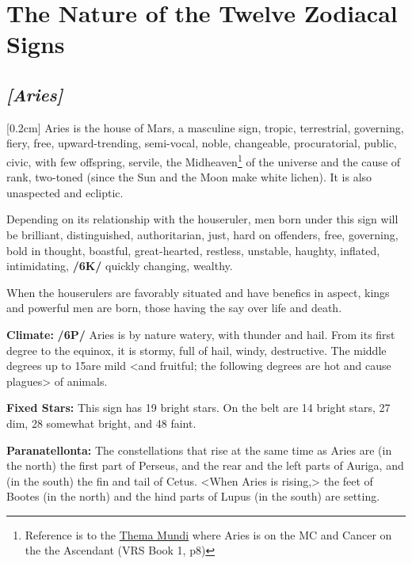 
\section{The Nature of the Twelve Zodiacal Signs}
\subsection{\textit{[Aries]}}
[0.2cm]
 Aries is the house of Mars, a  masculine sign,  tropic,  terrestrial, governing,  fiery, free, upward-trending,  semi-vocal, noble, changeable, procuratorial, public, civic, with few offspring,  servile, the Midheaven\footnote{Reference is to the \href{http://planetwavesweekly.com/dadatemp/1832374392.html}{Thema Mundi} where Aries is on the MC and Cancer on the the Ascendant (VRS Book 1, p8)} of the universe and the cause of rank, two-toned (since the Sun and the Moon make white lichen). It is also unaspected and ecliptic. 

\mndl[0.2cm]
Depending on its relationship with the houseruler, men born under this sign will be brilliant, distinguished, authoritarian, just, hard on offenders, free, governing, bold in thought, boastful, great-hearted, restless, unstable, haughty, inflated, intimidating, \textbf{/6K/} quickly changing, wealthy. 

\mndl[0.2cm]
When the houserulers are favorably situated and have benefics in aspect, kings and powerful men are born, those
having the say over life and death.

\textbf{Climate:} \textbf{/6P/} Aries is by nature watery, with thunder and hail. From its first degree to the equinox, it is stormy, full of hail, windy, destructive. The middle degrees up to 15\deg are mild <and fruitful; the following degrees are hot and cause plagues> of animals. 

\textbf{Fixed Stars:} This sign has 19 bright stars. On the belt are 14 bright stars, 27 dim, 28 somewhat bright, and 48 faint. 

\textbf{Paranatellonta:} The constellations that rise at the same time as Aries are (in the north) the first part of Perseus, and the rear and the left parts of Auriga, and (in the south) the fin and
tail of Cetus. <When Aries is rising,> the feet of Bootes (in the north) and the hind parts of Lupus (in the south) are setting.

